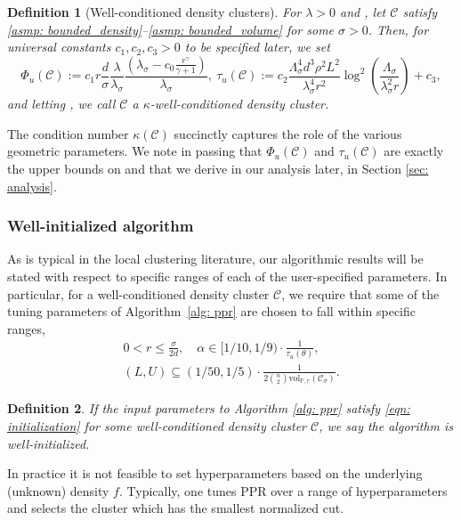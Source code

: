\documentclass[11pt,twoside]{article}
\newtheorem{definition}{Definition}
\newcommand{\vol}{\mathrm{vol}}
\newcommand{\1}{\mathbf{1}}
\newcommand{\Phibf}{\Phi_{u}}
\newcommand{\taubf}{\tau_{u}}
\newcommand{\Xbf}{X}             %
\newcommand{\Pbb}{\mathbb{P}}
\newcommand{\Cbb}{\mathbb{C}}
\newcommand{\Cset}{\mathcal{C}}
\newcommand{\Csig}{\Cset_{\sigma}}
\begin{document}
\begin{definition}[Well-conditioned density clusters]
  \label{def:well_conditioned_density_cluster}
  For $\lambda > 0$ and \smash{$\Cset \in \Cbb_f(\lambda)$}, let $\Cset$ satisfy 
  \ref{asmp: bounded_density}--\ref{asmp: bounded_volume} for some $\sigma > 0$. Then, for universal constants $c_1, c_2, c_3 > 0$ to be specified
  later, we set 
  \begin{equation}
    \label{eqn: condition_number_1}
    \Phibf(\Cset) 
    := c_1 r \frac{d}{\sigma} \frac{\lambda}{\lambda_{\sigma}}
    \frac{(\lambda_{\sigma} - c_0 \frac{r^{\gamma}}{\gamma +
        1})}{\lambda_{\sigma}},~  
    \taubf(\Cset) := c_2 \frac{\Lambda_{\sigma}^4 d^3 \rho^2
      L^2}{\lambda_{\sigma}^4 r^2} \log^2\left(\frac{\Lambda_{\sigma}}{\lambda_{\sigma}^2r}\right) + c_3,
  \end{equation}
  and letting \smash{$\kappa(\Cset) := \Phi_{u}(\Cset) \cdot
    \tau_{u}(\Cset)$}, we call $\Cset$ a 
  \emph{$\kappa$-well-conditioned density cluster}.  
\end{definition}
\noindent The condition number 
$\kappa(\Cset)$ succinctly captures the role of the various
geometric parameters. 
We note in passing that $\Phibf(\Cset)$ and $\taubf(\Cset)$ are exactly the upper bounds 
on \smash{$\Phi(\Csig[\Xbf]; G_{n,r})$} and
\smash{$\tau_{\infty}(G_{n,r}[\Csig[\Xbf]])$} that we derive in our analysis
later, in Section \ref{sec: analysis}. 

\subsubsection{Well-initialized algorithm} As is typical in the local clustering
literature, our algorithmic results will be stated with respect to specific
ranges of each of the user-specified parameters. In particular, for a
well-conditioned density cluster $\Cset$, we require that some of the tuning parameters of Algorithm~\ref{alg: ppr} are chosen to fall within specific ranges,
\begin{equation}
\begin{gathered}
\label{eqn: initialization}
0 < r \leq \frac{\sigma}{2d}, \quad 
\alpha \in [1/10, 1/9) \cdot \frac{1}{\taubf(\theta)}, \\
(L,U) \subseteq (1/50,1/5) \cdot \frac{1}{2{n \choose 2}\vol_{\Pbb,r}(\Csig)}.
\end{gathered}
\end{equation}

\begin{definition}
If the input parameters to Algorithm \ref{alg: ppr} satisfy \eqref{eqn:
  initialization} for some well-conditioned density cluster $\Cset$, we
say the algorithm is \emph{well-initialized}. 
\end{definition}
\noindent In practice it is  not feasible to set hyperparameters based on the
underlying (unknown) density $f$. Typically, one tunes PPR over a range of
hyperparameters and selects the cluster which has the smallest normalized cut. 
\end{document}
